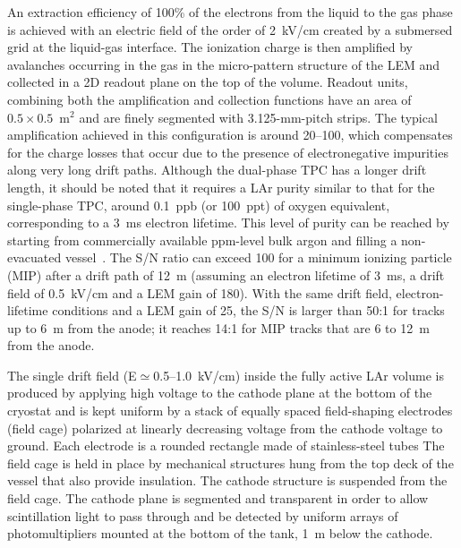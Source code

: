 An extraction efficiency of 100\% of the electrons from the liquid to
the gas phase is achieved with an electric field of the order of
2~kV/cm created by a submersed grid at the liquid-gas interface. The
ionization charge is then amplified by avalanches occurring in the gas
in the micro-pattern structure of the LEM and collected in a
2D readout plane on the top of the  volume. Readout units,
combining both the amplification and collection functions have an area
of $0.5\times 0.5$~m$^2$ and are finely segmented with 3.125-mm-pitch 
strips. The typical amplification achieved in this configuration
is around 20--100, 
which %
compensates for the charge losses that occur due to
the presence of electronegative impurities along very long drift
paths. Although the dual-phase TPC has a longer drift length, it should
be noted that it requires a LAr purity similar to that
for the single-phase TPC, 
around 0.1~ppb (or 100~ppt) of oxygen equivalent, corresponding to a 3~ms electron lifetime.
This level of purity can be reached by starting
from commercially available ppm-level bulk argon and filling a
non-evacuated vessel~\cite{WA105_TDR}.  The S/N ratio can exceed 100
for a minimum ionizing particle (MIP) after a drift path of
12~m (assuming an electron lifetime of 3~ms, a drift field of
0.5~kV/cm and a LEM gain of 180). With the same drift field, 
electron-lifetime conditions and a LEM gain of 25, the S/N is larger
than 50:1 for tracks up to 6~m from the anode; %
it reaches 14:1 for MIP tracks %
that are 6 to 12~m from the anode.

The single drift field (E${\simeq}$0.5--1.0~kV/cm) inside the fully active
LAr volume is produced by applying high voltage to the cathode plane
at the bottom of the cryostat and is kept uniform by a stack of
equally spaced field-shaping electrodes (field cage) polarized at
linearly decreasing voltage from the cathode voltage to ground. Each
electrode is a rounded rectangle made of stainless-steel tubes 
The field cage is held in place
by mechanical structures hung from the top deck of the
vessel that also provide insulation.  The cathode structure is suspended from the field cage. The
cathode plane is segmented %
and transparent in order to allow scintillation light to pass through and be
detected by uniform arrays of photomultipliers mounted
at the bottom of the tank, 1~m below the cathode. %

